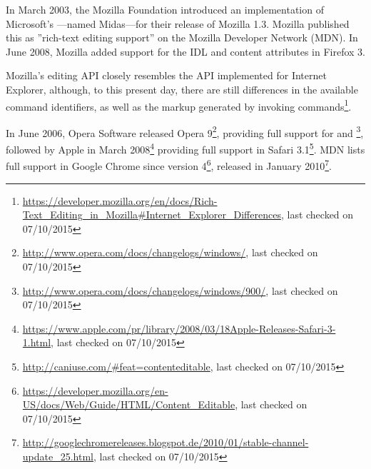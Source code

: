 In March 2003, the Mozilla Foundation introduced an implementation of Microsoft's ---named Midas---for their release of Mozilla 1.3. Mozilla published this as ''rich-text editing support'' on the Mozilla Developer Network (MDN)\cite{ak}. In June 2008, Mozilla added support for the  IDL and  content attributes in Firefox 3. 


Mozilla's editing API closely resembles the API implemented for Internet Explorer, although, to this present day, there are still differences in the available command identifiers\cite{am,ad}, as well as the markup generated by invoking commands\footnote{\url{https://developer.mozilla.org/en/docs/Rich-Text\_Editing\_in\_Mozilla\#Internet\_Explorer\_Differences}, last checked on 07/10/2015}. 




In June 2006, Opera Software released Opera 9\footnote{\url{http://www.opera.com/docs/changelogs/windows/}, last checked on 07/10/2015}, providing full support for  and \footnote{\url{http://www.opera.com/docs/changelogs/windows/900/}, last checked on 07/10/2015}, followed by Apple in March 2008\footnote{\url{https://www.apple.com/pr/library/2008/03/18Apple-Releases-Safari-3-1.html}, last checked on 07/10/2015} providing full support in Safari 3.1\footnote{\url{http://caniuse.com/\#feat=contenteditable}, last checked on 07/10/2015}. MDN lists full support in Google Chrome since version 4\footnote{\url{https://developer.mozilla.org/en-US/docs/Web/Guide/HTML/Content\_Editable}, last checked on 07/10/2015}, released in January 2010\footnote{\url{http://googlechromereleases.blogspot.de/2010/01/stable-channel-update\_25.html}, last checked on 07/10/2015}.

